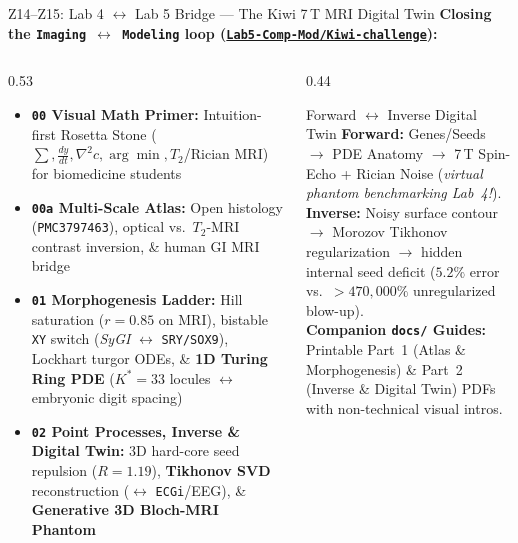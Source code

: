 \documentclass[aspectratio=169, 10pt]{beamer}
\begin{document}
\begin{frame}{Z14--Z15: Lab 4 $\leftrightarrow$ Lab 5 Bridge --- The Kiwi 7\,T MRI Digital Twin}
    \textbf{Closing the \texttt{Imaging $\leftrightarrow$ Modeling} loop (\href{https://github.com/arvidl/BMED365-2027/tree/main/Lab5-Comp-Mod/Kiwi-challenge}{\texttt{Lab5-Comp-Mod/Kiwi-challenge}}):}

    \vspace{0.1cm}
    \begin{columns}[T]
        \begin{column}{0.53\textwidth}
            \begin{itemize}\footnotesize
                \item \textbf{\texttt{00} Visual Math Primer:} Intuition-first Rosetta Stone ($\sum, \frac{dy}{dt}, \nabla^2 c, \arg\min, T_2$/Rician MRI) for biomedicine students
                \item \textbf{\texttt{00a} Multi-Scale Atlas:} Open histology (\texttt{PMC3797463}), optical vs.\ $T_2$-MRI contrast inversion, \& human GI MRI bridge
                \item \textbf{\texttt{01} Morphogenesis Ladder:} Hill saturation ($r=0.85$ on MRI), bistable \texttt{XY} switch (\textit{SyGI} $\leftrightarrow$ \texttt{SRY/SOX9}), Lockhart turgor ODEs, \& \textbf{1D Turing Ring PDE} ($K^*=33$ locules $\leftrightarrow$ embryonic digit spacing)
                \item \textbf{\texttt{02} Point Processes, Inverse \& Digital Twin:} 3D hard-core seed repulsion ($R=1.19$), \textbf{Tikhonov SVD} reconstruction ($\leftrightarrow$ \texttt{ECGi}/EEG), \& \textbf{Generative 3D Bloch-MRI Phantom}
            \end{itemize}
        \end{column}
        \begin{column}{0.44\textwidth}
            \begin{block}{\footnotesize Forward $\leftrightarrow$ Inverse Digital Twin}
                \footnotesize
                \textbf{Forward:} Genes/Seeds $\to$ PDE Anatomy $\to$ 7\,T Spin-Echo + Rician Noise (\textit{virtual phantom benchmarking Lab~4!}).\\[3pt]
                \textbf{Inverse:} Noisy surface contour $\to$ Morozov Tikhonov regularization $\to$ hidden internal seed deficit ($5.2\%$ error vs.\ $>470{,}000\%$ unregularized blow-up).\\[3pt]
                \textbf{Companion \texttt{docs/} Guides:} Printable Part~1 (Atlas \& Morphogenesis) \& Part~2 (Inverse \& Digital Twin) PDFs with non-technical visual intros.
            \end{block}
        \end{column}
    \end{columns}
\end{frame}
\end{document}

